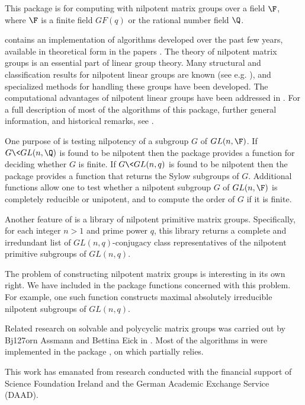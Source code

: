 
This package is for computing with nilpotent matrix groups over a
field $\F$, where $\F$ is a finite field $GF(q)$ or the rational
number field $\Q$.

 contains an implementation of algorithms
developed over the past few years, available in theoretical form
in the papers \cite{DF04,DF05b,DF06,DF07}. The theory of nilpotent
matrix groups is an essential part of linear group theory. Many
structural and classification results for nilpotent linear groups
are known (see e.g. \cite{Sup76,Weh73}), and specialized methods
for handling these groups have been developed. The computational
advantages of nilpotent linear groups have been addressed in
\cite{DF05a}. For a full description of most of the algorithms of
this package, further general information, and historical remarks,
see \cite{DF06,DF07}.

One purpose of  is testing nilpotency of a
subgroup $G$ of $GL(n,\F)$. If $G\< GL(n,\Q)$ is found to be
nilpotent then the package provides a function for deciding
whether $G$ is finite. If $G\< GL(n,q)$ is found to be nilpotent
then the package provides a function that returns the Sylow
subgroups of $G$. Additional functions allow one to test whether a
nilpotent subgroup $G$ of $GL(n,\F)$ is completely reducible or
unipotent, and to compute the order of $G$ if it is finite.

Another feature of  is a library of nilpotent
primitive matrix groups. Specifically, for each integer $n>1$ and
prime power $q$, this library returns a complete and irredundant
list of $GL(n,q)$-conjugacy class representatives of the
nilpotent primitive subgroups of $GL(n,q)$.

The problem of constructing nilpotent matrix groups is interesting
in its own right. We have included in the package functions
concerned with this problem. For example, one such function
constructs maximal absolutely irreducible nilpotent subgroups of
$GL(n,q)$.

Related research on solvable and polycyclic matrix groups was
carried out by Bj\accent127orn Assmann and Bettina Eick in
\cite{AE05,AE07}. Most of the algorithms in \cite{AE05} were
implemented in the {\GAP} package , on which
 partially relies.

This work has emanated from research conducted with the financial
support of Science Foundation Ireland and the German Academic
Exchange Service (DAAD).

